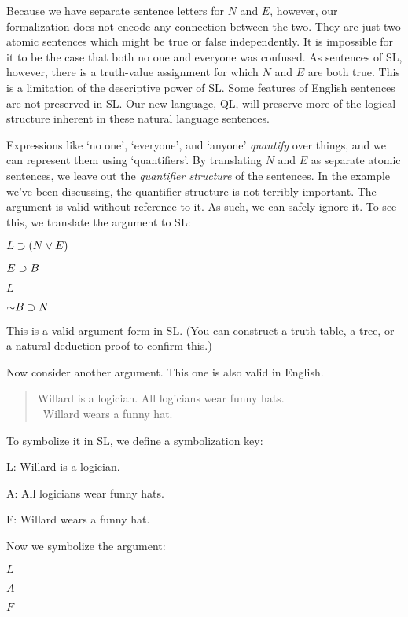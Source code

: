 Because we have separate sentence letters for $N$ and $E$, however, our formalization does not encode any connection between the two. They are just two atomic sentences which might be true or false independently. It is impossible for it to be the case that both no one and everyone was confused. As sentences of SL, however, there is a truth-value assignment for which $N$ and $E$ are both true. This is a limitation of the descriptive power of SL. Some features of English sentences are not preserved in SL. Our new language, QL, will preserve more of the logical structure inherent in these natural language sentences. 

Expressions like `no one', `everyone', and `anyone' \emph{quantify} over things, and we can represent them using `quantifiers'. By translating $N$ and $E$ as separate atomic sentences, we leave out the \emph{quantifier structure} of the sentences. In the example we've been discussing, the quantifier structure is not terribly important. The argument is valid without reference to it. As such, we can safely ignore it. To see this, we translate the argument to SL:
\begin{earg}
\item[]$L \supset (N \vee E)$
\item[]$E \supset B$
\item[]$L$
\item[\therefore]$\enot B \eif N$
\end{earg}
This is a valid argument form in SL. (You can construct a truth table, a tree, or a natural deduction proof to confirm this.) 

Now consider another argument. This one is also valid in English.

\begin{quote}
\label{willard1}
Willard is a logician. All logicians wear funny hats.\\
\therefore\ Willard wears a funny hat.
\end{quote}

To symbolize it in SL, we define a symbolization key:
\begin{ekey}
\item[L:] Willard is a logician.
\item[A:] All logicians wear funny hats.
\item[F:] Willard wears a funny hat.
\end{ekey}

Now we symbolize the argument:
\begin{earg}
\item[]$L$
\item[]$A$
\item[\therefore] $F$
\end{earg}

